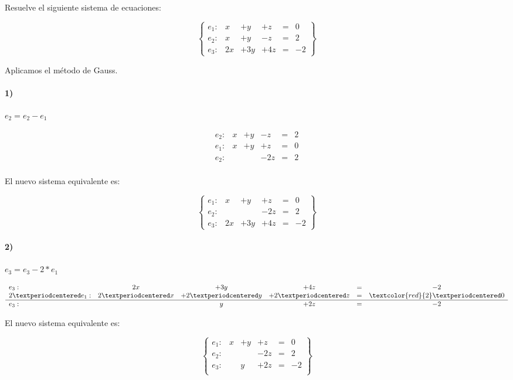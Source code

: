 \documentclass[palatino,nosec]{Docencia}
\begin{document}
\newpage
\begin{problem}
Resuelve el siguiente sistema de ecuaciones:

\[
\left\{\begin{array}{lccccc}
e_1: &x&+y&+z&=&0\\
e_2: &x&+y&-z&=&2\\
e_3: &2x&+3y&+4z&=&-2
\end{array}\right\}
\]

\solution

Aplicamos el método de Gauss. 

\paragraph{1)}
$e_2 = e_2-e_1$

\[
\begin{array}{lccccc}
e_2: &x&+y&-z&=&2\\
e_1: &x&+y&+z&=&0\\
\hline
e_2: &&&-2z&=&2\\
\end{array}
\]	

El nuevo sistema equivalente es:

\[
\left\{\begin{array}{lccccc}
e_1: &x&+y&+z&=&0\\
e_2: &&&-2z&=&2\\
e_3: &2x&+3y&+4z&=&-2
\end{array}\right\}
\]


\paragraph{2)}


$e_3 = e_3-2*e_1$

\[
\begin{array}{lccccc}
e_3: &2x&+3y&+4z&=&-2\\
2·e_1: &2·x&+2·y&+2·z&=&\textcolor{red}{2}·0\\
\hline
e_3: &&y&+2z&=&-2\\
\end{array}
\]	

El nuevo sistema equivalente es:

\[
\left\{\begin{array}{lccccc}
e_1: &x&+y&+z&=&0\\
e_2: &&&-2z&=&2\\
e_3: &&y&+2z&=&-2\\
\end{array}\right\}
\]


\end{problem}
\end{document}
